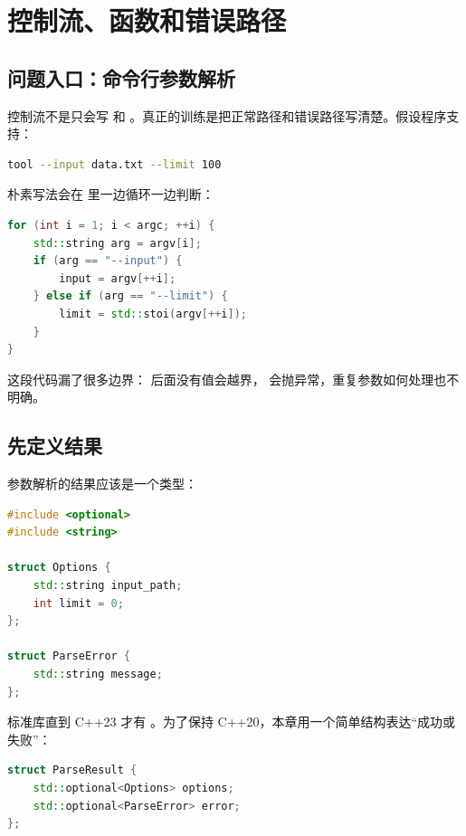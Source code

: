 \chapter{控制流、函数和错误路径}

\section{问题入口：命令行参数解析}

控制流不是只会写  和 。真正的训练是把正常路径和错误路径写清楚。假设程序支持：

\begin{lstlisting}[language=bash,caption={命令行需求}]
tool --input data.txt --limit 100
\end{lstlisting}

朴素写法会在  里一边循环一边判断：

\begin{lstlisting}[language=C++,caption={混乱的参数解析}]
for (int i = 1; i < argc; ++i) {
    std::string arg = argv[i];
    if (arg == "--input") {
        input = argv[++i];
    } else if (arg == "--limit") {
        limit = std::stoi(argv[++i]);
    }
}
\end{lstlisting}

这段代码漏了很多边界： 后面没有值会越界， 会抛异常，重复参数如何处理也不明确。

\section{先定义结果}

参数解析的结果应该是一个类型：

\begin{lstlisting}[language=C++,caption={参数解析结果}]
#include <optional>
#include <string>

struct Options {
    std::string input_path;
    int limit = 0;
};

struct ParseError {
    std::string message;
};
\end{lstlisting}

标准库直到 C++23 才有 。为了保持 C++20，本章用一个简单结构表达“成功或失败”：

\begin{lstlisting}[language=C++,caption={C++20 下的简单结果类型}]
struct ParseResult {
    std::optional<Options> options;
    std::optional<ParseError> error;
};
\end{lstlisting}

